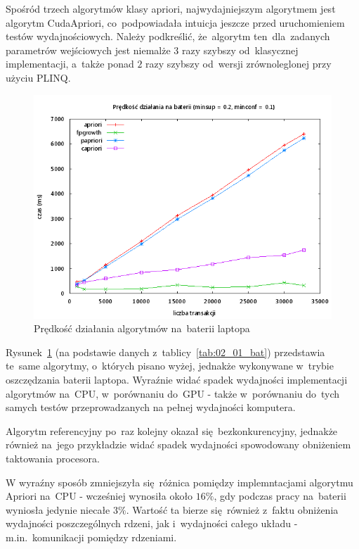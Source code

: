 Spośród trzech algorytmów klasy apriori, najwydajniejszym algorytmem jest algorytm CudaApriori, co~podpowiadała intuicja jeszcze przed uruchomieniem testów wydajnościowych. Należy podkreślić, że~algorytm ten~dla~zadanych parametrów wejściowych jest niemalże $3$ razy szybszy od~klasycznej implementacji, a~także ponad $2$ razy szybszy od~wersji zrównoleglonej przy użyciu PLINQ.

\begin{figure}[H]
\centering
\includegraphics[width=1.1\textwidth]{figures/06/02_01_bat.png}
\caption{Prędkość działania algorytmów na~baterii laptopa\label{rys:02_01_bat}}
\end{figure}

Rysunek~\ref{rys:02_01_bat} (na podstawie danych z~tablicy~\ref{tab:02_01_bat}) przedstawia te~same algorytmy, o~których pisano wyżej, jednakże wykonywane w~trybie oszczędzania baterii laptopa. Wyraźnie widać spadek wydajności implementacji algorytmów na~CPU, w~porównaniu do~GPU - także w~porównaniu do~tych samych testów przeprowadzanych na pełnej wydajności komputera.

Algorytm referencyjny po~raz kolejny okazał się~bezkonkurencyjny, jednakże również na~jego przykładzie widać spadek wydajności spowodowany obniżeniem taktowania procesora.

W wyraźny sposób zmniejszyła się~różnica pomiędzy implemntacjami algorytmu Apriori na~CPU - wcześniej wynosiła około $16\%$, gdy podczas pracy na~baterii wyniosła jedynie niecałe $3\%$. Wartość ta bierze się~również z~faktu obniżenia wydajności poszczególnych rdzeni, jak i~wydajności całego układu - m.in.~komunikacji pomiędzy rdzeniami.

